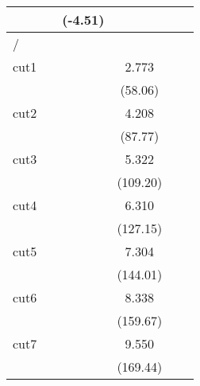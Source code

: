 {\begin{tabular}{l*{5}{c}}
            &                     &     (-4.51)         &                     &                     &                     \\
\hline
/           &                     &                     &                     &                     &                     \\
cut1        &                     &                     &       2.773\sym{***}&                     &                     \\
            &                     &                     &     (58.06)         &                     &                     \\
[1em]
cut2        &                     &                     &       4.208\sym{***}&                     &                     \\
            &                     &                     &     (87.77)         &                     &                     \\
[1em]
cut3        &                     &                     &       5.322\sym{***}&                     &                     \\
            &                     &                     &    (109.20)         &                     &                     \\
[1em]
cut4        &                     &                     &       6.310\sym{***}&                     &                     \\
            &                     &                     &    (127.15)         &                     &                     \\
[1em]
cut5        &                     &                     &       7.304\sym{***}&                     &                     \\
            &                     &                     &    (144.01)         &                     &                     \\
[1em]
cut6        &                     &                     &       8.338\sym{***}&                     &                     \\
            &                     &                     &    (159.67)         &                     &                     \\
[1em]
cut7        &                     &                     &       9.550\sym{***}&                     &                     \\
            &                     &                     &    (169.44)         &                     &                     \\

\end{tabular}}

